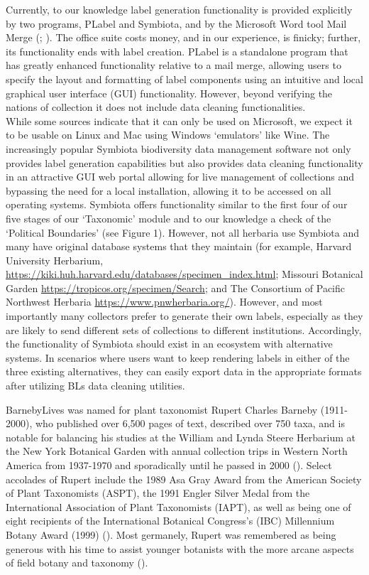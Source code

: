 \documentclass[
]{article}
\begin{document}
Currently, to our knowledge label generation functionality is provided
explicitly by two programs, PLabel and Symbiota, and by the Microsoft
Word tool Mail Merge (; ). The office
suite costs money, and in our experience, is finicky; further, its
functionality ends with label creation. PLabel is a standalone program
that has greatly enhanced functionality relative to a mail merge,
allowing users to specify the layout and formatting of label components
using an intuitive and local graphical user interface (GUI)
functionality. However, beyond verifying the nations of collection it
does not include data cleaning functionalities.\\
While some sources indicate that it can only be used on Microsoft, we
expect it to be usable on Linux and Mac using Windows `emulators' like
Wine. The increasingly popular Symbiota biodiversity data management
software not only provides label generation capabilities but also
provides data cleaning functionality in an attractive GUI web portal
allowing for live management of collections and bypassing the need for a
local installation, allowing it to be accessed on all operating systems.
Symbiota offers functionality similar to the first four of our five
stages of our `Taxonomic' module and to our knowledge a check of the
`Political Boundaries' (see Figure 1). However, not all herbaria use
Symbiota and many have original database systems that they maintain (for
example, Harvard University Herbarium,
\url{https://kiki.huh.harvard.edu/databases/specimen_index.html};
Missouri Botanical Garden \url{https://tropicos.org/specimen/Search};
and The Consortium of Pacific Northwest Herbaria
\url{https://www.pnwherbaria.org/}). However, and most importantly many
collectors prefer to generate their own labels, especially as they are
likely to send different sets of collections to different institutions.
Accordingly, the functionality of Symbiota should exist in an ecosystem
with alternative systems. In scenarios where users want to keep
rendering labels in either of the three existing alternatives, they can
easily export data in the appropriate formats after utilizing BLs data
cleaning utilities.

BarnebyLives was named for plant taxonomist Rupert Charles Barneby
(1911-2000), who published over 6,500 pages of text, described over 750
taxa, and is notable for balancing his studies at the William and Lynda
Steere Herbarium at the New York Botanical Garden with annual collection
trips in Western North America from 1937-1970 and sporadically until he
passed in 2000 (). Select
accolades of Rupert include the 1989 Asa Gray Award from the American
Society of Plant Taxonomists (ASPT), the 1991 Engler Silver Medal from
the International Association of Plant Taxonomists (IAPT), as well as
being one of eight recipients of the International Botanical Congress's
(IBC) Millennium Botany Award (1999)
(). Most germanely, Rupert
was remembered as being generous with his time to assist younger
botanists with the more arcane aspects of field botany and taxonomy
().
\end{document}
